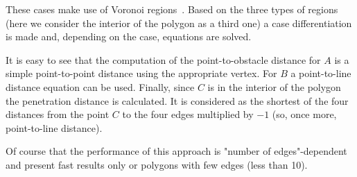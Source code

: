 %
%
%
%
%

These cases make use of Voronoi regions~\cite{ericson2004real}. Based on the three types of regions (here we consider the interior of the polygon as a third one) a case differentiation is made and, depending on the case, equations are solved.

It is easy to see that the computation of the point-to-obstacle distance for $A$ is a simple point-to-point distance
using the appropriate vertex. For $B$ a point-to-line distance equation can be used. Finally, since $C$ is in the
interior of the polygon the penetration distance is calculated. It is considered as the shortest of the four distances from the point $C$ to the
four edges multiplied by $-1$ (so, once more, point-to-line distance).

Of course that the performance of this approach is "number of edges"-dependent and present fast results only or 
polygons with few edges (less than 10). 

